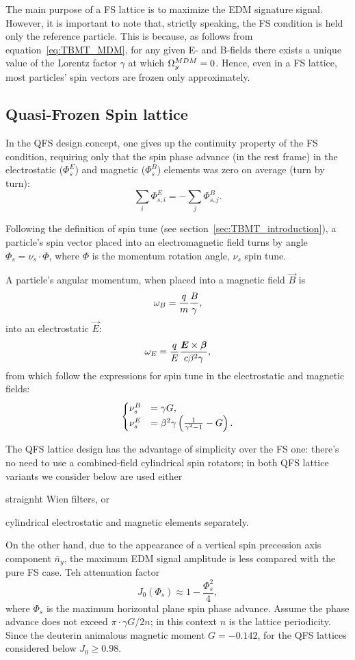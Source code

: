 The main purpose of a FS lattice is to maximize the EDM signature signal. However, it is important to note that,
strictly speaking, the FS condition is held only the reference particle. This is because, as follows from
equation~\eqref{eq:TBMT_MDM}, for any given E- and B-fields there exists a unique value of the Lorentz factor
$\gamma$ at which $\Omega_y^{MDM} = 0$. Hence, even in a FS lattice, most particles' spin vectors are frozen only
approximately.

\subsection{Quasi-Frozen Spin lattice} \label{chpt2:concept:QFS}
In the QFS design concept, one gives up the continuity property of the FS condition, requiring only that the spin
phase advance (in the rest frame) in the electrostatic ($\Phi_s^E$) and magnetic ($\Phi_s^B$) elements was zero
on average (turn by turn):~\cite{Senichev:Lattices}
\begin{equation*}
	\sum_i \Phi_{s,i}^E = -\sum_j \Phi_{s,j}^B.
\end{equation*}

Following the definition of spin tune (see section~\ref{sec:TBMT_introduction}), a particle's spin vector
placed into an electromagnetic field turns by angle $\Phi_s = \nu_s \cdot \Phi$, where $\Phi$ is
the momentum rotation angle, $\nu_s$ spin tune.

A particle's angular momentum, when placed into a magnetic field $\vec B$ is
\[
\omega_B = \frac qm \frac B \gamma,
\]
into an electrostatic $\vec E$:
\[
\omega_E = \frac qE \frac{\boldsymbol E\times \boldsymbol\beta}{c\beta^2\gamma},
\]
from which follow the expressions for spin tune in the electrostatic and magnetic fields:
\begin{equation}
	\begin{cases}
		\nu_s^B &= \gamma G, \\
		\nu_s^E &= \beta^2\gamma\bkt{\frac{1}{\gamma^2-1} - G}.
	\end{cases}
\end{equation}

The QFS lattice design has the advantage of simplicity over the FS one: there's no need to use a combined-field
cylindrical spin rotators; in both QFS lattice variants we consider below are used either
\begin{enumerate*}
\item straignht Wien filters,  or
\item cylindrical electrostatic and magnetic elements separately.
\end{enumerate*}
On the other hand, due to the appearance of a vertical spin precession axis component $\bar n_y$,
the maximum EDM signal amplitude is less compared with the pure FS case. Teh attenuation
factor~\cite{Senichev:QFS_IPAC15}
\[
J_0(\Phi_s) \approx 1 - \frac{\Phi_s^2}{4},
\]
where $\Phi_s$ is the maximum horizontal plane spin phase advance. Assume the phase advance does not
exceed $\pi\cdot \gamma G/2n$; in this context $n$ is the lattice periodicity. Since the deuterin animalous magnetic moment $G = -0.142$, for the QFS lattices considered below $J_0\ge 0.98$.

